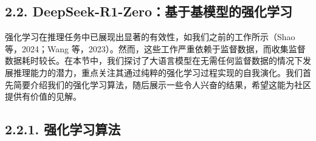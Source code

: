 \documentclass[12pt,a4paper]{report} %
\begin{document}
\subsection*{2.2. DeepSeek-R1-Zero：基于基模型的强化学习}


强化学习在推理任务中已展现出显著的有效性，如我们之前的工作所示（Shao 等，2024；Wang 等，2023）。然而，这些工作严重依赖于监督数据，而收集监督数据耗时较长。在本节中，我们探讨了大语言模型在无需任何监督数据的情况下发展推理能力的潜力，重点关注其通过纯粹的强化学习过程实现的自我演化。我们首先简要介绍我们的强化学习算法，随后展示一些令人兴奋的结果，希望这能为社区提供有价值的见解。


\subsection*{2.2.1. 强化学习算法}
\end{document}
